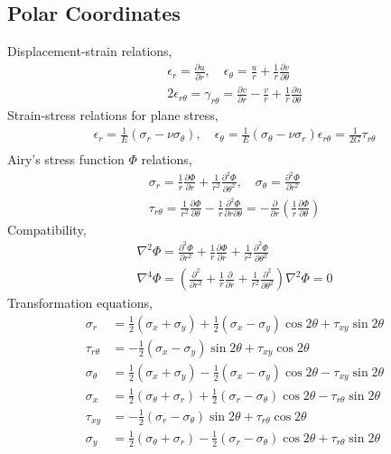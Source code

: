 \subsection*{Polar Coordinates}
Displacement-strain relations,
\begin{gather*}
    \epsilon_r = \frac{\partial u}{\partial r}, \quad \epsilon_\theta = \frac{u}{r} + \frac{1}{r} \frac{\partial v}{\partial \theta} \\
    2\epsilon_{r\theta} = \gamma_{r\theta} = \frac{\partial v}{\partial r} - \frac{v}{r} + \frac{1}{r} \frac{\partial u}{\partial \theta}
\end{gather*}
Strain-stress relations for plane stress,
\begin{gather*}
    \epsilon_r = \frac{1}{E} \left( \sigma_r - \nu \sigma_\theta \right), \quad \epsilon_\theta = \frac{1}{E} \left( \sigma_\theta - \nu \sigma_r \right)
    \epsilon_{r\theta} = \frac{1}{2G} \tau_{r\theta} \\
\end{gather*}
Airy's stress function $\Phi$ relations,
\begin{gather*}
    \sigma_r = \frac{1}{r}\frac{\partial \Phi}{\partial r} + \frac{1}{r^2} \frac{\partial^2 \Phi}{\partial \theta^2}, \quad \sigma_\theta = 
    \frac{\partial^2 \Phi}{\partial r^2} \\
    \tau_{r\theta} = \frac{1}{r^2}\frac{\partial \Phi}{\partial \theta} - \frac{1}{r}\frac{\partial^2 \Phi}{\partial r \partial \theta} = -
    \frac{\partial}{\partial r} \left( \frac{1}{r} \frac{\partial \Phi}{\partial \theta} \right)
\end{gather*}
Compatibility,
\begin{gather*}
    \nabla^2 \Phi = \frac{\partial^2 \Phi}{\partial r^2} + \frac{1}{r} \frac{\partial \Phi}{\partial r} + \frac{1}{r^2} \frac{\partial^2 \Phi}{\partial \theta^2} \\
    \nabla^4 \Phi = \left(\frac{\partial^2}{\partial r^2} + \frac{1}{r} \frac{\partial}{\partial r} + \frac{1}{r^2} \frac{\partial^2}{\partial \theta^2} \right) 
    \nabla^2 \Phi=0
\end{gather*}
Transformation equations,
\begin{align*}
    \sigma_r &= \frac{1}{2}(\sigma_x + \sigma_y) + \frac{1}{2}(\sigma_x - \sigma_y) \cos{2\theta} + \tau_{xy} \sin{2\theta} \\
    \tau_{r\theta} &= -\frac{1}{2}(\sigma_x - \sigma_y) \sin{2\theta} + \tau_{xy} \cos{2\theta} \\
    \sigma_\theta &= \frac{1}{2}(\sigma_x + \sigma_y) - \frac{1}{2}(\sigma_x - \sigma_y) \cos{2\theta} - \tau_{xy} \sin{2\theta}\\
    \sigma_x &= \frac{1}{2}(\sigma_\theta + \sigma_r) + \frac{1}{2}(\sigma_r - \sigma_\theta) \cos{2\theta} - \tau_{r\theta} \sin{2\theta} \\
    \tau_{xy} &= -\frac{1}{2}(\sigma_r - \sigma_\theta) \sin{2\theta} + \tau_{r\theta} \cos{2\theta} \\
    \sigma_y &= \frac{1}{2}(\sigma_\theta + \sigma_r) - \frac{1}{2}(\sigma_r - \sigma_\theta) \cos{2\theta} + \tau_{r\theta} \sin{2\theta}
\end{align*}
